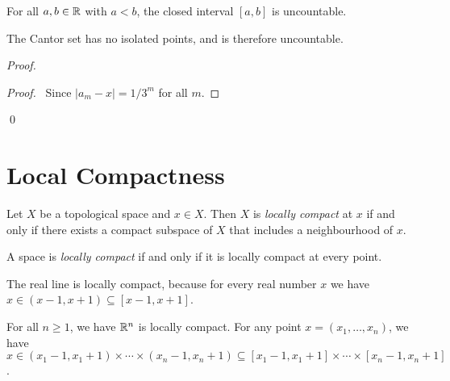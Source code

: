 \begin{corollary}
    \label{corollary:closed_interval_uncountable}
    For all $a, b \in \mathbb{R}$ with $a < b$, the closed interval $[a,b]$
    is uncountable.
\end{corollary}

\begin{example}
    The Cantor set has no isolated points, and is therefore uncountable.
\end{example}

\begin{proof}
    \pf
    \begin{proof}
        \pf\ Since $|a_m - x| = 1 / 3^m$ for all $m$.
    \end{proof}
    \qed
\end{proof}

\section{Local Compactness}

\begin{definition}
    Let $X$ be a topological space and $x \in X$. Then $X$ is \emph{locally
    compact} at $x$ if and only if there exists a compact subspace of $X$
    that includes a neighbourhood of $x$.

    A space is \emph{locally compact} if and only if it is locally compact at
    every point.
\end{definition}

\begin{example}
    The real line is locally compact, because for every real number $x$
    we have $x \in (x-1,x+1) \subseteq [x-1,x+1]$.
\end{example}

\begin{example}
    For all $n \geq 1$, we have $\mathbb{R}^n$ is locally compact. For any point 
    $x = (x_1, \ldots, x_n)$, we have $x \in (x_1 - 1, x_1 + 1) \times \cdots
    \times (x_n - 1, x_n + 1) \subseteq [x_1 - 1, x_1 + 1] \times \cdots
    \times [x_n - 1, x_n + 1]$.
\end{example}

